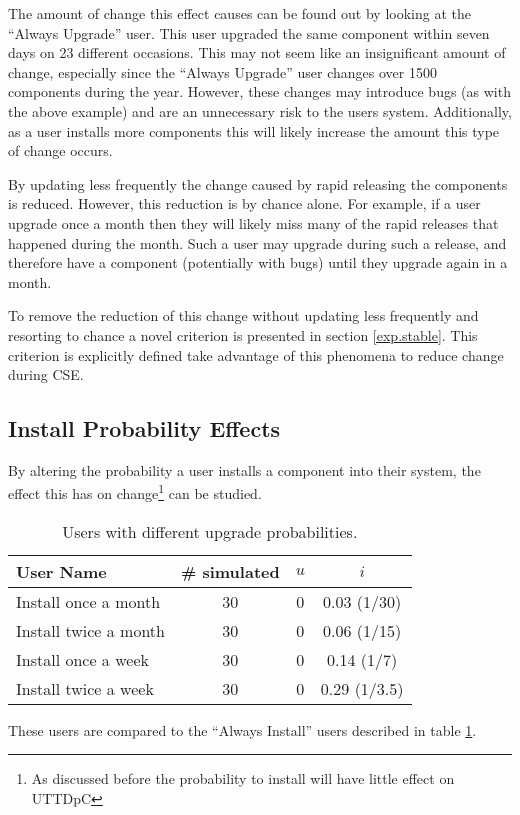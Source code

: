 The amount of change this effect causes can be found out by looking at the ``Always Upgrade'' user.
This user upgraded the same component within seven days on 23 different occasions.
This may not seem like an insignificant amount of change, especially since the ``Always Upgrade'' user changes over 1500 components during the year.
However, these changes may introduce bugs (as with the above example) and are an unnecessary risk to the users system.
Additionally, as a user installs more components this will likely increase the amount this type of change occurs.

By updating less frequently the change caused by rapid releasing the components is reduced.
However, this reduction is by chance alone.
For example, if a user upgrade once a month then they will likely miss many of the rapid releases that happened during the month.
Such a user may upgrade during such a release, and therefore have a component (potentially with bugs) until they upgrade again in a month.

To remove the reduction of this change without updating less frequently and resorting to chance a novel criterion is presented in section \ref{exp.stable}.
This criterion is explicitly defined take advantage of this phenomena to reduce change during CSE.


\subsection{Install Probability Effects}
By altering the probability a user installs a component into their system, the effect this has on 
change\footnote{As discussed before the probability to install will have little effect on UTTDpC} can be studied. 
\begin{table}[h!]
\centering
\begin{tabular}{|l | c | c | c |}
\hline
User Name 				& \# simulated 	& $u$ 		& $i$ 			\\ \hline
Install once a month	& 30 			& 0 & 0.03 (1/30)							 \\
Install twice a month	& 30 			& 0 & 0.06 (1/15)						\\
Install once a week		& 30 			& 0 & 0.14 (1/7)					 \\
Install twice a week 	& 30 			& 0 & 0.29 (1/3.5)						\\ \hline
\end{tabular}
\caption{Users with different upgrade probabilities.}
\label{exp.tblextremeusers}
\end{table}
These users are compared to the ``Always Install'' users described in table \ref{exp.tblextremeusers}.

